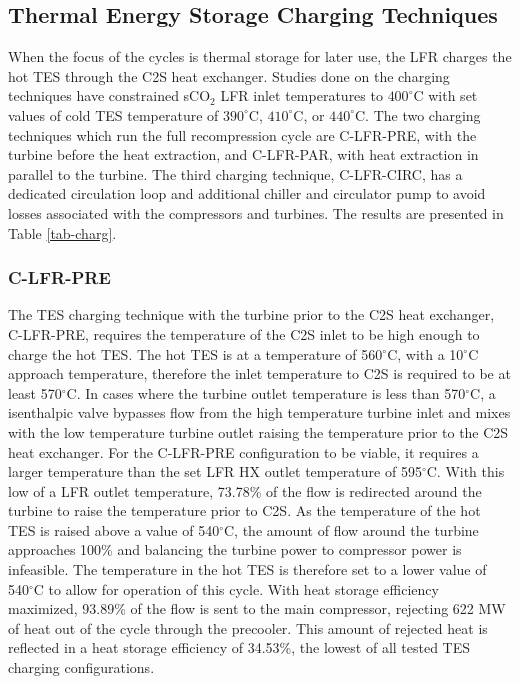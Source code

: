 \begin{paracol}{2}
\subsection{Thermal Energy Storage Charging Techniques}

When the focus of the cycles is thermal storage for later use, the LFR charges the hot TES through the C2S heat exchanger. Studies done on the charging techniques have constrained sCO$_2$ LFR inlet temperatures to $400^{\circ}$C with set values of cold TES temperature of $390^{\circ}$C, $410^{\circ}$C, or $440^{\circ}$C. The two charging techniques which run the full recompression cycle are C-LFR-PRE, with the turbine before the heat extraction, and C-LFR-PAR, with heat extraction in parallel to the turbine. The third charging technique, C-LFR-CIRC, has a dedicated circulation loop and additional chiller and circulator pump to avoid losses associated with the compressors and turbines. The results are presented in Table \ref{tab-charg}.  

\subsubsection{C-LFR-PRE}
The TES charging technique with the turbine prior to the C2S heat exchanger, C-LFR-PRE, requires the temperature of the C2S inlet to be high enough to charge the hot TES. The hot TES is at a temperature of 560$^{\circ}$C, with a 10$^{\circ}$C approach temperature, therefore the inlet temperature to C2S is required to be at least 570$^{\circ}$C. In cases where the turbine outlet temperature is less than 570$^{\circ}$C, a isenthalpic valve bypasses flow from the high temperature turbine inlet and mixes with the low temperature turbine outlet raising the temperature prior to the C2S heat exchanger. For the C-LFR-PRE configuration to be viable, it requires a larger temperature than the set LFR HX outlet temperature of 595$^{\circ}$C. With this low of a LFR outlet temperature, 73.78\% of the flow is redirected around the turbine to raise the temperature prior to C2S. As the temperature of the hot TES is raised above a value of 540$^{\circ}$C, the amount of flow around the turbine approaches 100\% and balancing the turbine power to compressor power is infeasible. The temperature in the hot TES is therefore set to a lower value of 540$^{\circ}$C to allow for operation of this cycle. With heat storage efficiency maximized, 93.89\% of the flow is sent to the main compressor, rejecting 622 MW of heat out of the cycle through the precooler. This amount of rejected heat is reflected in a heat storage efficiency of 34.53\%, the lowest of all tested TES charging configurations.


\end{paracol}
